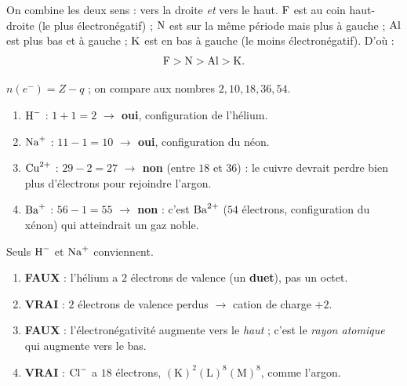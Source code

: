 \documentclass[11pt,a4paper]{article}
\begin{document}
\begin{corrige}
On combine les deux sens : vers la droite \emph{et} vers le haut. $\ce{F}$ est au coin haut-droite
(le plus électronégatif) ; $\ce{N}$ est sur la même période mais plus à gauche ; $\ce{Al}$ est plus bas
et à gauche ; $\ce{K}$ est en bas à gauche (le moins électronégatif). D'où :
\[ \ce{F} > \ce{N} > \ce{Al} > \ce{K}. \]
\end{corrige}

\begin{corrige}
$n(e^-) = Z - q$ ; on compare aux nombres $2, 10, 18, 36, 54$.
\begin{enumerate}[label=\alph*)]
  \item $\ce{H^{-}}$ : $1+1 = 2$ \textbf{\textcolor{excol}{$\to$ oui}}, configuration de l'hélium.
  \item $\ce{Na^{+}}$ : $11-1 = 10$ \textbf{\textcolor{excol}{$\to$ oui}}, configuration du néon.
  \item $\ce{Cu^{2+}}$ : $29-2 = 27$ \textbf{\textcolor{attncol}{$\to$ non}} (entre $18$ et $36$) :
        le cuivre devrait perdre bien plus d'électrons pour rejoindre l'argon.
  \item $\ce{Ba^{+}}$ : $56-1 = 55$ \textbf{\textcolor{attncol}{$\to$ non}} : c'est $\ce{Ba^{2+}}$
        ($54$ électrons, configuration du xénon) qui atteindrait un gaz noble.
\end{enumerate}
Seuls $\ce{H^{-}}$ et $\ce{Na^{+}}$ conviennent.
\end{corrige}

\begin{corrige}
\begin{enumerate}[label=\alph*)]
  \item \textbf{\textcolor{attncol}{FAUX}} : l'hélium a $2$ électrons de valence (un \textbf{duet}),
        pas un octet.
  \item \textbf{\textcolor{excol}{VRAI}} : $2$ électrons de valence perdus $\to$ cation de charge $+2$.
  \item \textbf{\textcolor{attncol}{FAUX}} : l'électronégativité augmente vers le \emph{haut} ; c'est le
        \emph{rayon atomique} qui augmente vers le bas.
  \item \textbf{\textcolor{excol}{VRAI}} : $\ce{Cl^{-}}$ a $18$ électrons,
        $(\mathrm{K})^2(\mathrm{L})^8(\mathrm{M})^8$, comme l'argon.
\end{enumerate}
\end{corrige}
\end{document}

